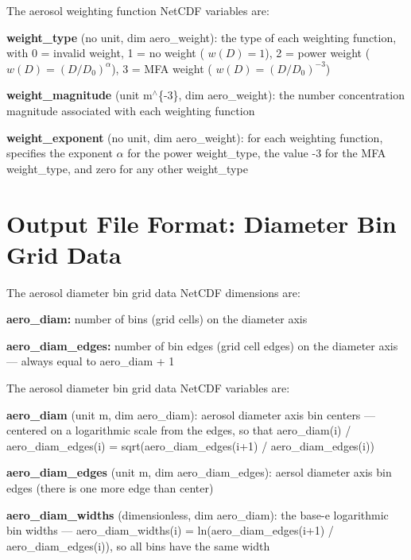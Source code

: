 The aerosol weighting function Net\+C\+DF variables are\+:
\begin{DoxyItemize}
\item {\bfseries weight\+\_\+type} (no unit, dim {\ttfamily aero\+\_\+weight})\+: the type of each weighting function, with 0 = invalid weight, 1 = no weight ( $w(D) = 1$), 2 = power weight ( $w(D) = (D/D_0)^\alpha$), 3 = M\+FA weight ( $w(D) = (D/D_0)^{-3}$)
\item {\bfseries weight\+\_\+magnitude} (unit m$^\wedge$\{-\/3\}, dim {\ttfamily aero\+\_\+weight})\+: the number concentration magnitude associated with each weighting function
\item {\bfseries weight\+\_\+exponent} (no unit, dim {\ttfamily aero\+\_\+weight})\+: for each weighting function, specifies the exponent $\alpha$ for the power {\ttfamily weight\+\_\+type}, the value -\/3 for the M\+FA {\ttfamily weight\+\_\+type}, and zero for any other {\ttfamily weight\+\_\+type} 
\end{DoxyItemize}\hypertarget{output_format_diam_bin_grid}{}\section{Output File Format\+: Diameter Bin Grid Data}\label{output_format_diam_bin_grid}
The aerosol diameter bin grid data Net\+C\+DF dimensions are\+:


\begin{DoxyItemize}
\item {\bfseries aero\+\_\+diam\+:} number of bins (grid cells) on the diameter axis
\item {\bfseries aero\+\_\+diam\+\_\+edges\+:} number of bin edges (grid cell edges) on the diameter axis --- always equal to {\ttfamily aero\+\_\+diam + 1}
\end{DoxyItemize}

The aerosol diameter bin grid data Net\+C\+DF variables are\+:
\begin{DoxyItemize}
\item {\bfseries aero\+\_\+diam} (unit m, dim {\ttfamily aero\+\_\+diam})\+: aerosol diameter axis bin centers --- centered on a logarithmic scale from the edges, so that {\ttfamily aero\+\_\+diam(i) / aero\+\_\+diam\+\_\+edges(i) = sqrt(aero\+\_\+diam\+\_\+edges(i+1) / aero\+\_\+diam\+\_\+edges(i))}
\item {\bfseries aero\+\_\+diam\+\_\+edges} (unit m, dim {\ttfamily aero\+\_\+diam\+\_\+edges})\+: aersol diameter axis bin edges (there is one more edge than center)
\item {\bfseries aero\+\_\+diam\+\_\+widths} (dimensionless, dim {\ttfamily aero\+\_\+diam})\+: the base-\/e logarithmic bin widths --- {\ttfamily aero\+\_\+diam\+\_\+widths(i) = ln(aero\+\_\+diam\+\_\+edges(i+1) / aero\+\_\+diam\+\_\+edges(i))}, so all bins have the same width
\end{DoxyItemize}

